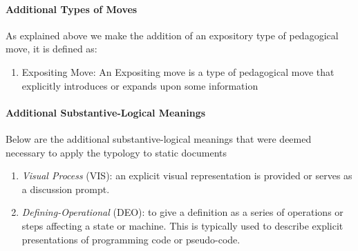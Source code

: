 \documentclass[conference]{IEEEtran}
\begin{document}
\paragraph{Additional Types of Moves}
As explained above we make the addition of an expository type of pedagogical
move, it is defined as:
\begin{enumerate}
  \item{Expositing Move:} An Expositing move is a type of pedagogical move
  that explicitly introduces or expands upon some information
\end{enumerate}

\paragraph{Additional Substantive-Logical Meanings}
Below are the additional substantive-logical meanings that were deemed necessary
to apply the typology to static documents
\begin{enumerate}
  \item \emph{Visual Process} (VIS): an explicit visual representation is
    provided or serves as a discussion prompt.
  \item \emph{Defining-Operational} (DEO): to give a definition as a series
    of operations or steps affecting a state or machine. This is typically
    used to
    describe explicit presentations of programming code or pseudo-code.
\end{enumerate}
\end{document}
